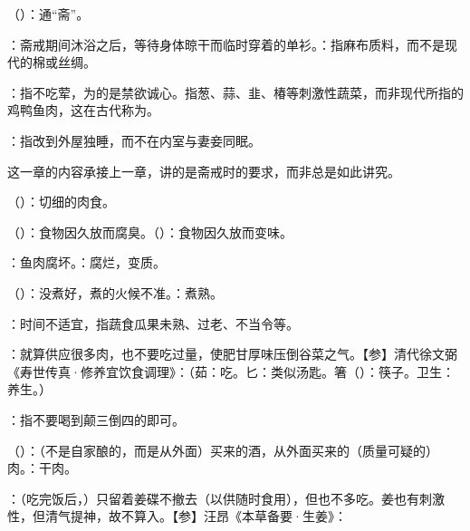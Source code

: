 {
\item {}（）：通“斋”。
\item {}：斋戒期间沐浴之后，等待身体晾干而临时穿着的单衫。：指麻布质料，而不是现代的棉或丝绸。
\item {}：指不吃荤，为的是禁欲诚心。指葱、蒜、韭、椿等刺激性蔬菜，而非现代所指的鸡鸭鱼肉，这在古代称为。%
\item {}：指改到外屋独睡，而不在内室与妻妾同眠。
}
{}


{
这一章的内容承接上一章，讲的是斋戒时的要求，而非总是如此讲究。
\begin{lyitemize}
\item {}（）：切细的肉食。
\item {}（）：食物因久放而腐臭。（）：食物因久放而变味。

：鱼肉腐坏。：腐烂，变质。
\item {}（）：没煮好，煮的火候不准。：煮熟。

：时间不适宜，指蔬食瓜果未熟、过老、不当令等。
\item {}：就算供应很多肉，也不要吃过量，使肥甘厚味压倒谷菜之气。【参】清代徐文弼《寿世传真·修养宜饮食调理》：（茹：吃。匕：类似汤匙。箸（）：筷子。卫生：养生。）
\item {}：指不要喝到颠三倒四的即可。
\item {}（）：（不是自家酿的，而是从外面）买来的酒，从外面买来的（质量可疑的）肉。：干肉。
\item {}：（吃完饭后，）只留着姜碟不撤去（以供随时食用），但也不多吃。姜也有刺激性，但清气提神，故不算入。【参】汪昂《本草备要·生姜》：
\end{lyitemize}
}
{}


